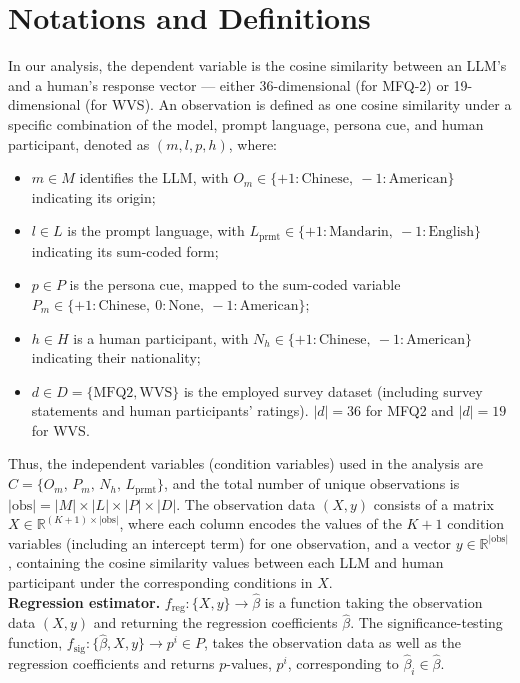 \appendix
\section{Notations and Definitions}\label{notations-and-definitions}

In our analysis, the dependent variable is the cosine similarity between an LLM's and a human's response vector — either 36-dimensional (for MFQ-2) or 19-dimensional (for WVS). An observation is defined as one cosine similarity under a specific combination of the model, prompt language, persona cue, and human participant, denoted as \((m,l,p,h)\), where:

\begin{itemize}
\item
  \(m \in M\) identifies the LLM, with
  \(O_{m} \in \{ +1:\text{Chinese},\ -1:\text{American}\}\) indicating its origin;
\item
  \(l \in L\) is the prompt language, with
  \(L_{\text{prmt}} \in \{ +1:\text{Mandarin},\ -1:\text{English}\}\)
  indicating its sum-coded form;
\item
  \(p \in P\) is the persona cue, mapped to the sum-coded variable
  \(P_{m} \in \{ +1:\text{Chinese},\ 0:\text{None},\ -1:\text{American}\}\);
\item
  \(h \in H\) is a human participant, with
  \(N_{h} \in \{ +1:\text{Chinese},\ -1:\text{American}\}\) indicating their nationality;
\item
  \(d \in D = \{\text{MFQ2}, \text{WVS}\}\) is the employed survey dataset (including
  survey statements and human participants' ratings).
  \(|d|=36\) for MFQ2 and \(|d|=19\) for WVS.
\end{itemize}

Thus, the independent variables (condition variables) used in the
analysis are \(C = \{ O_{m},\, P_{m},\, N_{h},\, L_{\text{prmt}}\}\), and the
total number of unique observations is
\(|\text{obs}| = |M| \times |L| \times |P| \times |D|\). The observation data
\((X,y)\) consists of a matrix \(X \in \mathbb{R}^{(K + 1) \times |\text{obs}|}\), where
each column encodes the values of the \(K + 1\) condition variables
(including an intercept term) for one observation, and a vector
\(y \in \mathbb{R}^{|\text{obs}|}\), containing the cosine similarity values between
each LLM and human participant under the corresponding conditions in
\(X\).\\

\textbf{Regression estimator.}
\(f_{\text{reg}}:\{ X,y\} \rightarrow \widehat{\beta}\) is a function taking
the observation data \((X,y)\) and returning the regression coefficients
\(\widehat{\beta}\). The significance-testing function,
\(f_{\text{sig}}:\{\widehat{\beta},X,y\} \rightarrow p^{i} \in P\), takes the
observation data as well as the regression coefficients and returns
\(p\)-values, \(p^{i}\), corresponding to
\(\widehat{\beta}_{i} \in \widehat{\beta}\).\\

